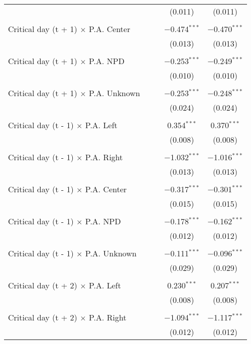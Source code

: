 \documentclass[
]{article}
\begin{document}
\begin{table}[!htbp]
{\begin{tabular}{@{\extracolsep{5pt}}lcccc}
  &  &  & (0.011) & (0.011) \\ 
  & & & & \\ 
 Critical day (t + 1) $\times$ P.A. Center &  &  & $-$0.474$^{***}$ & $-$0.470$^{***}$ \\ 
  &  &  & (0.013) & (0.013) \\ 
  & & & & \\ 
 Critical day (t + 1) $\times$ P.A. NPD &  &  & $-$0.253$^{***}$ & $-$0.249$^{***}$ \\ 
  &  &  & (0.010) & (0.010) \\ 
  & & & & \\ 
 Critical day (t + 1) $\times$ P.A. Unknown &  &  & $-$0.253$^{***}$ & $-$0.248$^{***}$ \\ 
  &  &  & (0.024) & (0.024) \\ 
  & & & & \\ 
 Critical day (t - 1) $\times$ P.A. Left &  &  & 0.354$^{***}$ & 0.370$^{***}$ \\ 
  &  &  & (0.008) & (0.008) \\ 
  & & & & \\ 
 Critical day (t - 1) $\times$ P.A. Right &  &  & $-$1.032$^{***}$ & $-$1.016$^{***}$ \\ 
  &  &  & (0.013) & (0.013) \\ 
  & & & & \\ 
 Critical day (t - 1) $\times$ P.A. Center &  &  & $-$0.317$^{***}$ & $-$0.301$^{***}$ \\ 
  &  &  & (0.015) & (0.015) \\ 
  & & & & \\ 
 Critical day (t - 1) $\times$ P.A. NPD &  &  & $-$0.178$^{***}$ & $-$0.162$^{***}$ \\ 
  &  &  & (0.012) & (0.012) \\ 
  & & & & \\ 
 Critical day (t - 1) $\times$ P.A. Unknown &  &  & $-$0.111$^{***}$ & $-$0.096$^{***}$ \\ 
  &  &  & (0.029) & (0.029) \\ 
  & & & & \\ 
 Critical day (t + 2) $\times$ P.A. Left &  &  & 0.230$^{***}$ & 0.207$^{***}$ \\ 
  &  &  & (0.008) & (0.008) \\ 
  & & & & \\ 
 Critical day (t + 2) $\times$ P.A. Right &  &  & $-$1.094$^{***}$ & $-$1.117$^{***}$ \\ 
  &  &  & (0.012) & (0.012) \\ 

\end{tabular}}
\end{table}
\end{document}
